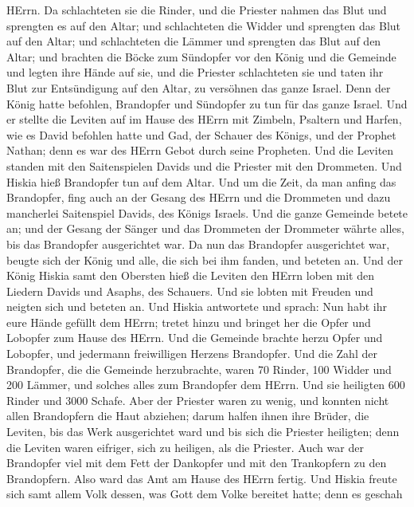 HErrn.  Da schlachteten sie die Rinder, und die Priester
nahmen das Blut und sprengten es auf den Altar; und schlachteten die
Widder und sprengten das Blut auf den Altar; und schlachteten die Lämmer
und sprengten das Blut auf den Altar;  und brachten die
Böcke zum Sündopfer vor den König und die Gemeinde und legten ihre Hände
auf sie,  und die Priester schlachteten sie und taten ihr
Blut zur Entsündigung auf den Altar, zu versöhnen das ganze Israel. Denn
der König hatte befohlen, Brandopfer und Sündopfer zu tun für das ganze
Israel.  Und er stellte die Leviten auf im Hause des HErrn
mit Zimbeln, Psaltern und Harfen, wie es David befohlen hatte und Gad,
der Schauer des Königs, und der Prophet Nathan; denn es war des HErrn
Gebot durch seine Propheten.  Und die Leviten standen mit
den Saitenspielen Davids und die Priester mit den Drommeten.
 Und Hiskia hieß Brandopfer tun auf dem Altar. Und um die
Zeit, da man anfing das Brandopfer, fing auch an der Gesang des HErrn
und die Drommeten und dazu mancherlei Saitenspiel Davids, des Königs
Israels.  Und die ganze Gemeinde betete an; und der Gesang
der Sänger und das Drommeten der Drommeter währte alles, bis das
Brandopfer ausgerichtet war.  Da nun das Brandopfer
ausgerichtet war, beugte sich der König und alle, die sich bei ihm
fanden, und beteten an.  Und der König Hiskia samt den
Obersten hieß die Leviten den HErrn loben mit den Liedern Davids und
Asaphs, des Schauers. Und sie lobten mit Freuden und neigten sich und
beteten an.  Und Hiskia antwortete und sprach: Nun habt ihr
eure Hände gefüllt dem HErrn; tretet hinzu und bringet her die Opfer und
Lobopfer zum Hause des HErrn. Und die Gemeinde brachte herzu Opfer und
Lobopfer, und jedermann freiwilligen Herzens Brandopfer. 
Und die Zahl der Brandopfer, die die Gemeinde herzubrachte, waren 70
Rinder, 100 Widder und 200 Lämmer, und solches alles zum Brandopfer dem
HErrn.  Und sie heiligten 600 Rinder und 3000 Schafe.
 Aber der Priester waren zu wenig, und konnten nicht allen
Brandopfern die Haut abziehen; darum halfen ihnen ihre Brüder, die
Leviten, bis das Werk ausgerichtet ward und bis sich die Priester
heiligten; denn die Leviten waren eifriger, sich zu heiligen, als die
Priester.  Auch war der Brandopfer viel mit dem Fett der
Dankopfer und mit den Trankopfern zu den Brandopfern. Also ward das Amt
am Hause des HErrn fertig.  Und Hiskia freute sich samt
allem Volk dessen, was Gott dem Volke bereitet hatte; denn es geschah
